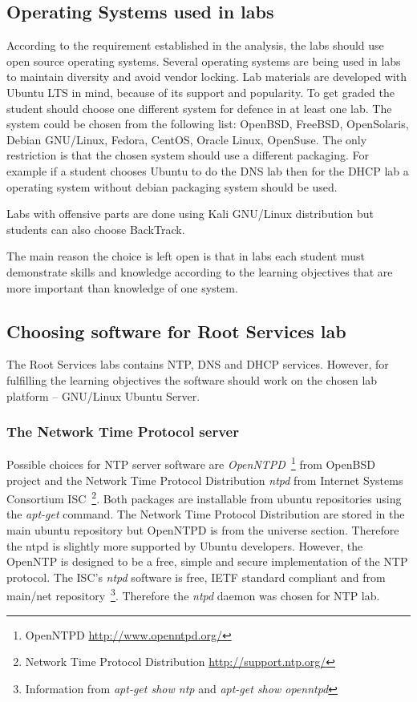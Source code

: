 \subsection{Operating Systems used in labs}

According to the requirement established in the analysis, the labs should use open source operating systems.
Several operating systems are being used in labs to maintain diversity and avoid vendor locking.
Lab materials are developed with Ubuntu LTS in mind, because of its support and popularity. To get graded the student should choose one different system for defence in at least one lab. The system could be chosen from the following list: OpenBSD, FreeBSD, OpenSolaris, Debian GNU/Linux, Fedora, CentOS, Oracle Linux, OpenSuse. The only restriction is that the chosen system should use a different packaging. For example if a student chooses Ubuntu to do the \gls{DNS} lab then for the \gls{DHCP} lab a operating system without debian packaging system should be used.

Labs with offensive parts are done using Kali GNU/Linux distribution but students can also choose BackTrack.

The main reason the choice is left open is that in labs each student must demonstrate skills and knowledge according to the learning objectives that are more important than knowledge of one system.

\subsection{Choosing software for Root Services lab}
The Root Services labs contains \gls{NTP}, \gls{DNS} and \gls{DHCP} services. However, for fulfilling the learning objectives the software should work on the chosen lab platform -- GNU/Linux Ubuntu Server. 

\subsubsection{The Network Time Protocol server}
Possible choices for \gls{NTP} server software are \emph{OpenNTPD}~\footnote{OpenNTPD \url{http://www.openntpd.org/}
} from OpenBSD  project and the Network Time Protocol Distribution \emph{ntpd} from  Internet Systems Consortium \gls{ISC}~\footnote{Network Time Protocol Distribution \url{http://support.ntp.org/}}. Both packages are installable from ubuntu repositories using the \emph{apt-get} command. The Network Time Protocol Distribution are stored in the main ubuntu repository but OpenNTPD is from the universe section. Therefore the \gls{ntpd} is  slightly more supported by Ubuntu developers.
However, the OpenNTP is designed to be a free, simple and secure implementation of the \gls{NTP} protocol. The \gls{ISC}'s \emph{ntpd} software is free, \gls{IETF} standard compliant and from main/net repository~\footnote{Information from \emph{apt-get show ntp} and \emph{apt-get show openntpd}}. Therefore the \emph{ntpd} daemon was chosen for \gls{NTP} lab.
